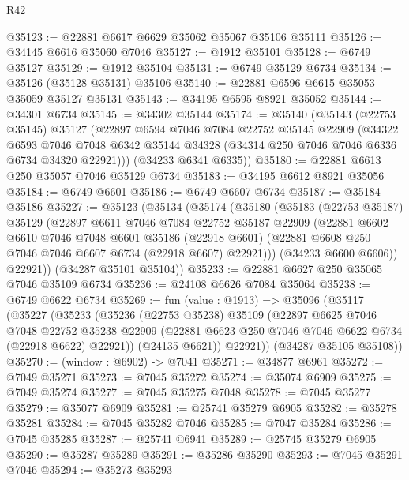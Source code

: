 \begin{lexlean}{R42}
\begin{coremodule}
{@35123 := @22881 @6617 @6629 @35062 @35067 @35106 @35111
@35126 := @34145 @6616 @35060 @7046
@35127 := @1912 @35101
@35128 := @6749 @35127
@35129 := @1912 @35104
@35131 := @6749 @35129 @6734
@35134 := @35126 (@35128 @35131) @35106
@35140 := @22881 @6596 @6615 @35053 @35059 @35127 @35131
@35143 := @34195 @6595 @8921 @35052
@35144 := @34301 @6734
@35145 := @34302 @35144
@35174 := @35140
    (@35143
      (@22753 @35145)
      @35127
      (@22897
        @6594
        @7046
        @7084
        @22752
        @35145
        @22909
        (@34322
          @6593
          @7046
          @7048
          @6342
          @35144
          @34328
          (@34314 @250 @7046 @7046 @6336 @6734 @34320 @22921)))
      (@34233 @6341 @6335))
@35180 := @22881 @6613 @250 @35057 @7046 @35129 @6734
@35183 := @34195 @6612 @8921 @35056
@35184 := @6749 @6601
@35186 := @6749 @6607 @6734
@35187 := @35184 @35186
@35227 := @35123
    (@35134
      (@35174
        (@35180
          (@35183
            (@22753 @35187)
            @35129
            (@22897
              @6611
              @7046
              @7084
              @22752
              @35187
              @22909
              (@22881
                @6602
                @6610
                @7046
                @7048
                @6601
                @35186
                (@22918 @6601)
                (@22881 @6608 @250 @7046 @7046 @6607 @6734 (@22918 @6607) @22921)))
            (@34233 @6600 @6606))
          @22921))
      (@34287 @35101 @35104))
@35233 := @22881 @6627 @250 @35065 @7046 @35109 @6734
@35236 := @24108 @6626 @7084 @35064
@35238 := @6749 @6622 @6734
@35269 := fun (value : @1913) =>
  @35096
    (@35117
      (@35227
        (@35233
          (@35236
            (@22753 @35238)
            @35109
            (@22897
              @6625
              @7046
              @7048
              @22752
              @35238
              @22909
              (@22881 @6623 @250 @7046 @7046 @6622 @6734 (@22918 @6622) @22921))
            (@24135 @6621))
          @22921))
      (@34287 @35105 @35108))
@35270 := (window : @6902) -> @7041
@35271 := @34877 @6961
@35272 := @7049 @35271
@35273 := @7045 @35272
@35274 := @35074 @6909
@35275 := @7049 @35274
@35277 := @7045 @35275 @7048
@35278 := @7045 @35277
@35279 := @35077 @6909
@35281 := @25741 @35279 @6905
@35282 := @35278 @35281
@35284 := @7045 @35282 @7046
@35285 := @7047 @35284
@35286 := @7045 @35285
@35287 := @25741 @6941
@35289 := @25745 @35279 @6905
@35290 := @35287 @35289
@35291 := @35286 @35290
@35293 := @7045 @35291 @7046
@35294 := @35273 @35293
}
\end{coremodule}
\end{lexlean}
